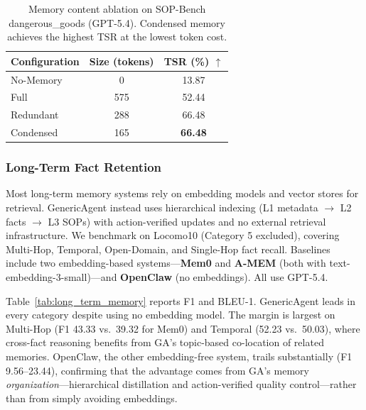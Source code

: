 \begin{table}[t]
\centering
\caption{Memory content ablation on SOP-Bench dangerous\_goods (GPT-5.4). Condensed memory achieves the highest TSR at the lowest token cost.}
\label{tab:memory_ablation}
\begin{tabular}{lcc}
\toprule
\textbf{Configuration} & \textbf{Size (tokens)} & \textbf{TSR (\%) $\uparrow$} \\
\midrule
No-Memory   & 0   & 13.87 \\
Full        & 575 & 52.44 \\
Redundant   & 288 & 66.48 \\
Condensed   & 165 & \textbf{66.48} \\
\bottomrule
\end{tabular}
\end{table}


\subsubsection{Long-Term Fact Retention}
\label{sec:exp_mem_fact}

Most long-term memory systems rely on embedding models and vector stores for retrieval.
GenericAgent instead uses hierarchical indexing (L1 metadata $\to$ L2 facts $\to$ L3 SOPs) with action-verified updates and no external retrieval infrastructure.
We benchmark on Locomo10 (Category 5 excluded), covering Multi-Hop, Temporal, Open-Domain, and Single-Hop fact recall.
Baselines include two embedding-based systems---\textbf{Mem0} and \textbf{A-MEM} (both with text-embedding-3-small)---and \textbf{OpenClaw} (no embeddings).
All use GPT-5.4.

Table~\ref{tab:long_term_memory} reports F1 and BLEU-1.
GenericAgent leads in every category despite using no embedding model.
The margin is largest on Multi-Hop (F1 43.33 vs.\ 39.32 for Mem0) and Temporal (52.23 vs.\ 50.03), where cross-fact reasoning benefits from GA's topic-based co-location of related memories.
OpenClaw, the other embedding-free system, trails substantially (F1 9.56--23.44), confirming that the advantage comes from GA's memory \emph{organization}---hierarchical distillation and action-verified quality control---rather than from simply avoiding embeddings.

